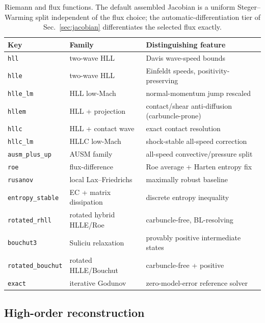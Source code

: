 \documentclass[journal,biblatex]{new-aiaa}
\begin{document}
\begin{table}[H]
\centering
\caption{Riemann and flux functions. The default assembled Jacobian is a
uniform Steger--Warming split independent of the flux choice; the
automatic-differentiation tier of Sec.~\ref{sec:jacobian} differentiates the
selected flux exactly.}
\label{tab:riemann}
\begin{tabular}{@{}lll@{}}
\toprule
Key & Family & Distinguishing feature \\
\midrule
\texttt{hll} & two-wave HLL & Davis wave-speed bounds \\
\texttt{hlle} & two-wave HLL & Einfeldt speeds, positivity-preserving \\
\texttt{hlle\_lm} & HLL low-Mach & normal-momentum jump rescaled \\
\texttt{hllem} & HLL + projection & contact/shear anti-diffusion (carbuncle-prone) \\
\texttt{hllc} & HLL + contact wave & exact contact resolution \\
\texttt{hllc\_lm} & HLLC low-Mach & shock-stable all-speed correction \\
\texttt{ausm\_plus\_up} & AUSM family & all-speed convective/pressure split \\
\texttt{roe} & flux-difference & Roe average + Harten entropy fix \\
\texttt{rusanov} & local Lax--Friedrichs & maximally robust baseline \\
\texttt{entropy\_stable} & EC + matrix dissipation & discrete entropy inequality \\
\texttt{rotated\_rhll} & rotated hybrid HLLE/Roe & carbuncle-free, BL-resolving \\
\texttt{bouchut3} & Suliciu relaxation & provably positive intermediate states \\
\texttt{rotated\_bouchut} & rotated HLLE/Bouchut & carbuncle-free + positive \\
\texttt{exact} & iterative Godunov & zero-model-error reference solver \\
\bottomrule
\end{tabular}
\end{table}

\subsection{High-order reconstruction}
\label{sec:recon}
\end{document}
